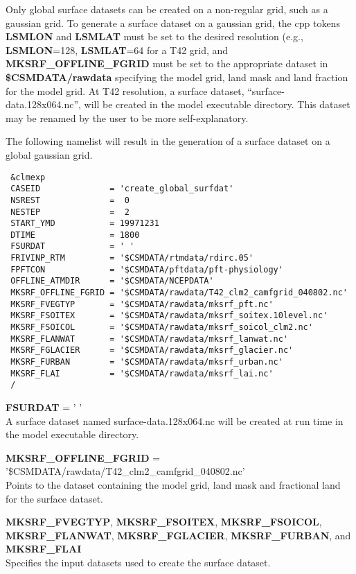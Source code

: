 \medskip \noindent  
Only global surface datasets can be created on a non-regular grid,
such as a gaussian grid. To generate a surface dataset on a gaussian
grid, the cpp tokens {\bf LSMLON} and {\bf LSMLAT} must be set to the
desired resolution (e.g., {\bf LSMLON}=128, {\bf LSMLAT}=64 for a T42
grid, and {\bf MKSRF\_OFFLINE\_FGRID} must be set to the appropriate
dataset in {\bf \$CSMDATA/rawdata} specifying the model grid, land
mask and land fraction for the model grid. At T42 resolution, a
surface dataset, ``surface-data.128x064.nc'', will be created in the
model executable directory. This dataset may be renamed by the user to
be more self-explanatory.

\medskip \noindent 
The following namelist will result in the generation of a surface
dataset on a global gaussian grid.

\begin{verbatim}
 &clmexp 
 CASEID              = 'create_global_surfdat'  
 NSREST              =  0 
 NESTEP              =  2 
 START_YMD           = 19971231 
 DTIME               = 1800 
 FSURDAT             = ' '   
 FRIVINP_RTM         = '$CSMDATA/rtmdata/rdirc.05' 
 FPFTCON             = '$CSMDATA/pftdata/pft-physiology' 
 OFFLINE_ATMDIR      = '$CSMDATA/NCEPDATA' 
 MKSRF_OFFLINE_FGRID = '$CSMDATA/rawdata/T42_clm2_camfgrid_040802.nc' 
 MKSRF_FVEGTYP       = '$CSMDATA/rawdata/mksrf_pft.nc' 
 MKSRF_FSOITEX       = '$CSMDATA/rawdata/mksrf_soitex.10level.nc' 
 MKSRF_FSOICOL       = '$CSMDATA/rawdata/mksrf_soicol_clm2.nc' 
 MKSRF_FLANWAT       = '$CSMDATA/rawdata/mksrf_lanwat.nc' 
 MKSRF_FGLACIER      = '$CSMDATA/rawdata/mksrf_glacier.nc' 
 MKSRF_FURBAN        = '$CSMDATA/rawdata/mksrf_urban.nc' 
 MKSRF_FLAI          = '$CSMDATA/rawdata/mksrf_lai.nc' 
 / 
\end{verbatim}

\medskip \noindent 
{\bf FSURDAT} = ' ' \\ 
A surface dataset named surface-data.128x064.nc will be created at run
time in the model executable directory.

\medskip \noindent 
{\bf MKSRF\_OFFLINE\_FGRID} = '\$CSMDATA/rawdata/T42\_clm2\_camfgrid\_040802.nc'\\ 
Points to the dataset containing the model grid, land mask and
fractional land for the surface dataset.

\medskip \noindent 
{\bf MKSRF\_FVEGTYP}, {\bf MKSRF\_FSOITEX}, {\bf MKSRF\_FSOICOL}, {\bf
MKSRF\_FLANWAT}, {\bf MKSRF\_FGLACIER}, {\bf MKSRF\_FURBAN}, and {\bf
MKSRF\_FLAI} \\ 
Specifies the input datasets used to create the surface dataset.

